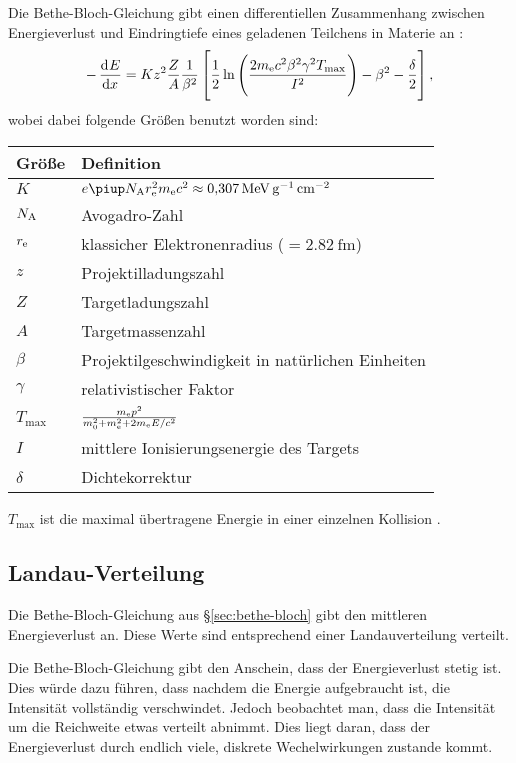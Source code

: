 \documentclass[11pt, ngerman, fleqn, DIV=15, headinclude, BCOR=2cm]{scrreprt}
\begin{document}
Die Bethe-Bloch-Gleichung gibt einen differentiellen Zusammenhang zwischen
Energieverlust und Eindringtiefe eines geladenen Teilchens in Materie an
\parencite[(4.6)]{Grupen/Astroteilchenphysik}:
\[
    - \dod Ex = K z^2 \frac ZA \frac{1}{\beta^2} \sbr{\frac 12
        \ln\del{\frac{2m_\text e c^2 \beta^2 \gamma^2 T_\text{max}}{I^2}} -
    \beta^2 - \frac\delta2},
\]
wobei dabei folgende Größen benutzt worden sind:

\begin{tabular}{ll}
    Größe & Definition \\
    \midrule
    $K$ & $e\piup N_\text A r_\text e^2 m_\text e c^2 \approx
    \SI{0.307}{\mega\electronvolt\per\gram\per\centi\meter\squared}$ \\
    $N_\text A$ & Avogadro-Zahl \\
    $r_\text e$ & klassicher Elektronenradius ($= \SI{2.82}{\femto\meter}$)
    \\
    $z$ & Projektilladungszahl \\
    $Z$ & Targetladungszahl \\
    $A$ & Targetmassenzahl \\
    $\beta$ & Projektilgeschwindigkeit in natürlichen Einheiten \\
    $\gamma$ & relativistischer Faktor \\
    $T_\text{max}$ & $\frac{m_\text e p^2}{m_0^2 + m_\text e^2 + 2 m_\text e E / c^2}$ \\
    $I$ & mittlere Ionisierungsenergie des Targets \\
    $\delta$ & Dichtekorrektur
\end{tabular}

$T_\text{max}$ ist die maximal übertragene Energie in einer einzelnen
Kollision \parencite[24]{Leo/Techniques_Nuclear_Experiments}.


\subsection{Landau-Verteilung}

Die Bethe-Bloch-Gleichung aus §\ref{sec:bethe-bloch} gibt den mittleren
Energieverlust an. Diese Werte sind entsprechend einer Landauverteilung
verteilt. \parencite[44]{Grupen/Astroteilchenphysik}

Die Bethe-Bloch-Gleichung gibt den Anschein, dass der Energieverlust stetig
ist. Dies würde dazu führen, dass nachdem die Energie aufgebraucht ist, die
Intensität vollständig verschwindet. Jedoch beobachtet man, dass die Intensität
um die Reichweite etwas verteilt abnimmt. Dies liegt daran, dass der
Energieverlust durch endlich viele, diskrete Wechelwirkungen zustande kommt.
\parencite[§2.2.9]{Leo/Techniques_Nuclear_Experiments}
\end{document}
